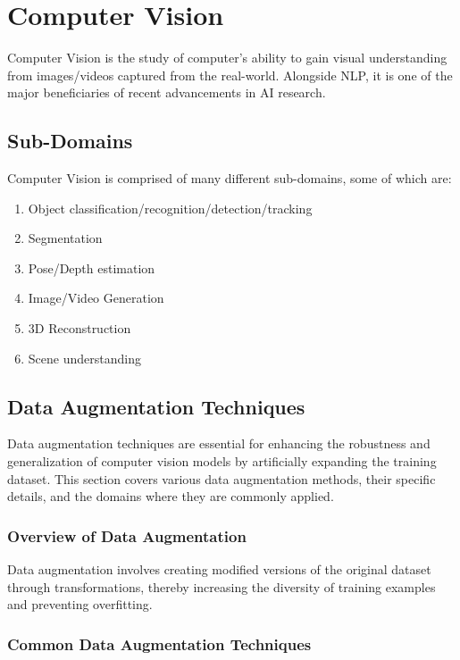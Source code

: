 \documentclass[12pt]{article}
\begin{document}
\section{Computer Vision}

Computer Vision is the study of computer's ability to gain visual understanding from images/videos captured from the real-world. Alongside NLP, it is one of the major beneficiaries of recent advancements in AI research.

\subsection{Sub-Domains}

Computer Vision is comprised of many different sub-domains, some of which are:

\begin{enumerate}
    \item Object classification/recognition/detection/tracking
    \item Segmentation
    \item Pose/Depth estimation
    \item Image/Video Generation
    \item 3D Reconstruction
    \item Scene understanding
\end{enumerate}

\subsection{Data Augmentation Techniques}

Data augmentation techniques are essential for enhancing the robustness and generalization of computer vision models by artificially expanding the training dataset. This section covers various data augmentation methods, their specific details, and the domains where they are commonly applied.

\subsubsection{Overview of Data Augmentation}

Data augmentation involves creating modified versions of the original dataset through transformations, thereby increasing the diversity of training examples and preventing overfitting.

\subsubsection{Common Data Augmentation Techniques}
\end{document}
